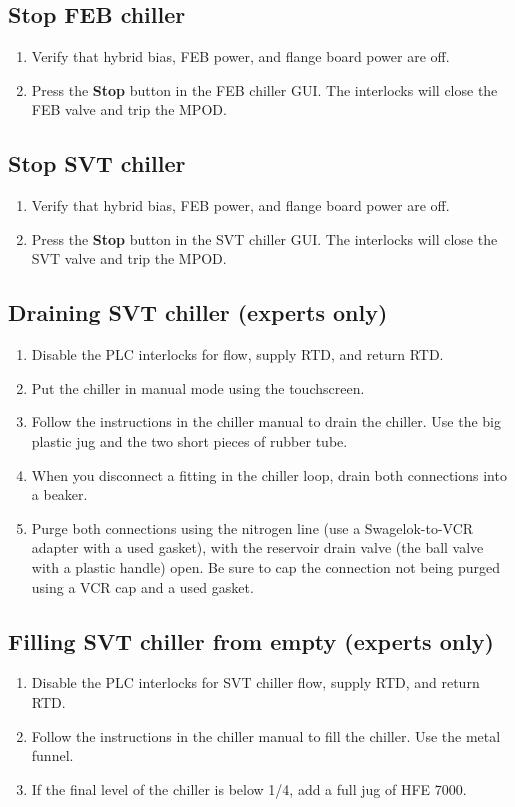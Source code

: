 \subsection{Stop FEB chiller}
\begin{enumerate}
    \item Verify that hybrid bias, FEB power, and flange board power are off.
    \item Press the \textbf{Stop} button in the FEB chiller GUI. The interlocks will close the FEB valve and trip the MPOD.
\end{enumerate}

\subsection{Stop SVT chiller}
\begin{enumerate}
    \item Verify that hybrid bias, FEB power, and flange board power are off.
    \item Press the \textbf{Stop} button in the SVT chiller GUI. The interlocks will close the SVT valve and trip the MPOD.
\end{enumerate}

\subsection{Draining SVT chiller (experts only)}
\begin{enumerate}
    \item Disable the PLC interlocks for flow, supply RTD, and return RTD.
    \item Put the chiller in manual mode using the touchscreen.
    \item Follow the instructions in the chiller manual to drain the chiller. Use the big plastic jug and the two short pieces of rubber tube.

    \item When you disconnect a fitting in the chiller loop, drain both connections into a beaker.
    \item Purge both connections using the nitrogen line (use a Swagelok-to-VCR adapter with a used gasket), with the reservoir drain valve (the ball valve with a plastic handle) open.
        Be sure to cap the connection not being purged using a VCR cap and a used gasket. 
\end{enumerate}

\subsection{Filling SVT chiller from empty (experts only)}
\begin{enumerate}
    \item Disable the PLC interlocks for SVT chiller flow, supply RTD, and return RTD.
    \item Follow the instructions in the chiller manual to fill the chiller. Use the metal funnel.
    \item If the final level of the chiller is below 1/4, add a full jug of HFE 7000.
\end{enumerate}

